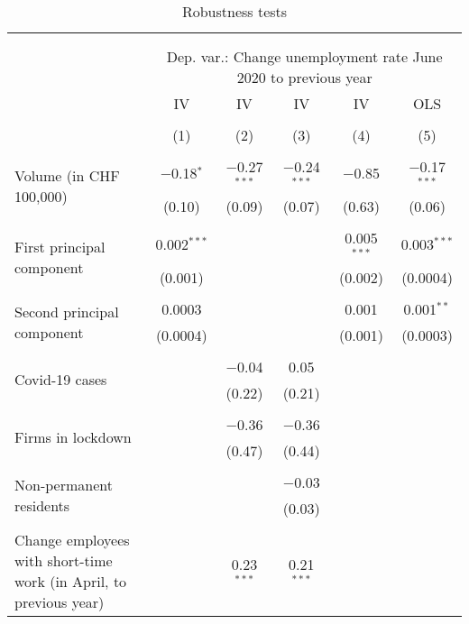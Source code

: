 
\begin{table}[!htbp] \centering 
  \caption{Robustness tests} 
  \label{tab:Robust} 
\footnotesize 
\begin{tabular}{@{\extracolsep{5pt}}lccccc} 
\\[-1.8ex]\hline 
\hline \\[-1.8ex] 
\\[-1.8ex] & \multicolumn{5}{c}{Dep. var.: Change unemployment rate June 2020 to previous year} \\ 
 & IV & IV & IV & IV & OLS \\ 
\\[-1.8ex] & (1) & (2) & (3) & (4) & (5)\\ 
\hline \\[-1.8ex] 
 \multirow{2}{4.5cm}{Volume (in CHF 100,000)} & $-$0.18$^{*}$ & $-$0.27$^{***}$ & $-$0.24$^{***}$ & $-$0.85 & $-$0.17$^{***}$ \\ 
  & (0.10) & (0.09) & (0.07) & (0.63) & (0.06) \\ 
  & & & & & \\ 
 \multirow{2}{4.5cm}{First principal component} & 0.002$^{***}$ &  &  & 0.005$^{***}$ & 0.003$^{***}$ \\ 
  & (0.001) &  &  & (0.002) & (0.0004) \\ 
  & & & & & \\ 
 \multirow{2}{4.5cm}{Second principal component} & 0.0003 &  &  & 0.001 & 0.001$^{**}$ \\ 
  & (0.0004) &  &  & (0.001) & (0.0003) \\ 
  & & & & & \\ 
 \multirow{2}{4.5cm}{Covid-19 cases} &  & $-$0.04 & 0.05 &  &  \\ 
  &  & (0.22) & (0.21) &  &  \\ 
  & & & & & \\ 
 \multirow{2}{4.5cm}{Firms in lockdown} &  & $-$0.36 & $-$0.36 &  &  \\ 
  &  & (0.47) & (0.44) &  &  \\ 
  & & & & & \\ 
 \multirow{2}{4.5cm}{Non-permanent residents} &  &  & $-$0.03 &  &  \\ 
  &  &  & (0.03) &  &  \\ 
  & & & & & \\ 
 \multirow{2}{4.5cm}{Change employees with short-time work (in April, to previous year)} &  & 0.23$^{***}$ & 0.21$^{***}$ &  &  \\ 

\end{tabular}
\end{table}
